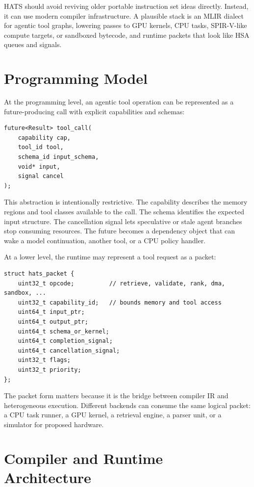\documentclass[11pt]{article}
\begin{document}
HATS should avoid reviving older portable instruction set ideas directly.
Instead, it can use modern compiler infrastructure. A plausible stack is an
MLIR dialect for agentic tool graphs, lowering passes to GPU kernels, CPU
tasks, SPIR-V-like compute targets, or sandboxed bytecode, and runtime packets
that look like HSA queues and signals.

\section{Programming Model}

At the programming level, an agentic tool operation can be represented as a
future-producing call with explicit capabilities and schemas:

\begin{lstlisting}
future<Result> tool_call(
    capability cap,
    tool_id tool,
    schema_id input_schema,
    void* input,
    signal cancel
);
\end{lstlisting}

This abstraction is intentionally restrictive. The capability describes the
memory regions and tool classes available to the call. The schema identifies
the expected input structure. The cancellation signal lets speculative or stale
agent branches stop consuming resources. The future becomes a dependency object
that can wake a model continuation, another tool, or a CPU policy handler.

At a lower level, the runtime may represent a tool request as a packet:

\begin{lstlisting}
struct hats_packet {
    uint32_t opcode;          // retrieve, validate, rank, dma, sandbox, ...
    uint32_t capability_id;   // bounds memory and tool access
    uint64_t input_ptr;
    uint64_t output_ptr;
    uint64_t schema_or_kernel;
    uint64_t completion_signal;
    uint64_t cancellation_signal;
    uint32_t flags;
    uint32_t priority;
};
\end{lstlisting}

The packet form matters because it is the bridge between compiler IR and
heterogeneous execution. Different backends can consume the same logical packet:
a CPU task runner, a GPU kernel, a retrieval engine, a parser unit, or a
simulator for proposed hardware.

\section{Compiler and Runtime Architecture}
\end{document}
